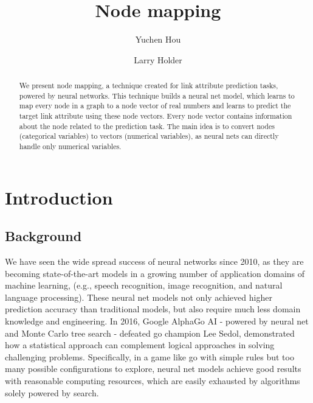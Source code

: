 \documentclass{article}
\begin{document}
\lstset{language=python, tabsize=4}
\title{Node mapping}
\author{Yuchen Hou \and Larry Holder}
\maketitle

\begin{abstract}
	We present node mapping, a technique created for link attribute prediction 
	tasks, powered by neural networks.
	This technique builds a neural net model, which learns to map every node in 
	a graph to a node vector of real numbers and learns to predict the target 
	link attribute using these node vectors.
	Every node vector contains information about the node related to the
	prediction task.
	The main idea is to convert nodes (categorical variables) to vectors 
	(numerical variables), as neural nets can directly handle only numerical 
	variables.
\end{abstract}

\section{Introduction}

\subsection{Background}
We have seen the wide spread success of neural networks since 2010, as they are 
becoming state-of-the-art models in a growing number of application domains of 
machine learning, (e.g., speech recognition\cite{hannun2014deep}, image 
recognition\cite{simonyan2014very}, and natural language 
processing\cite{yao2013recurrent}).
These neural net models not only achieved higher prediction accuracy than 
traditional models, but also require much less domain knowledge and engineering.
In 2016, Google AlphaGo AI - powered by neural net and Monte Carlo tree search 
- defeated go champion Lee Sedol, demonstrated how a statistical approach can 
complement logical approaches in solving challenging 
problems\cite{silver2016mastering}.
Specifically, in a game like go with simple rules but too many possible 
configurations to explore, neural net models achieve good results with 
reasonable computing resources, which are easily exhausted by algorithms solely 
powered by search.
\end{document}
